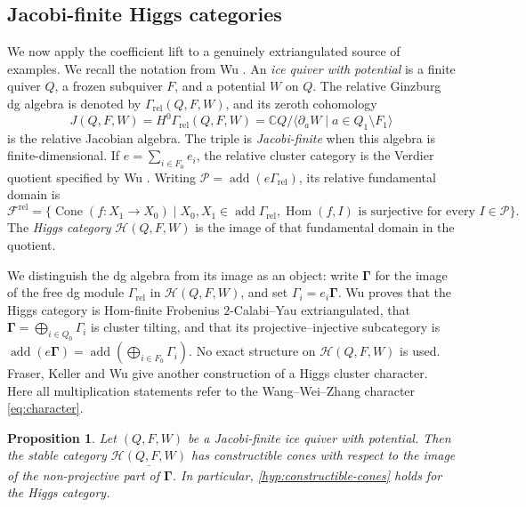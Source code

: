\documentclass[11pt,reqno]{article}
\numberwithin{equation}{section}
\newtheorem{proposition}[proposition]{Proposition}
\theoremstyle{definition}
\DeclareMathOperator{\add}{add}
\DeclareMathOperator{\Hom}{Hom}
\newcommand{\kk}{\mathbb C}
\begin{document}
\subsection{Jacobi-finite Higgs categories}\label{subsec:general-higgs}
We now apply the coefficient lift to a genuinely extriangulated source of
examples.  We recall the notation from Wu \cite{WuRelative}.  An
\emph{ice quiver with potential} is a finite quiver $Q$, a frozen subquiver
$F$, and a potential $W$ on $Q$.  The relative Ginzburg dg algebra is denoted
by $\Gamma_{\mathrm{rel}}(Q,F,W)$, and its zeroth cohomology
\[
 J(Q,F,W)=H^0\Gamma_{\mathrm{rel}}(Q,F,W)
 =\kk Q/\langle\partial_aW\mid a\in Q_1\setminus F_1\rangle
\]
is the relative Jacobian algebra.  The triple is \emph{Jacobi-finite} when this
algebra is finite-dimensional.  If $e=\sum_{i\in F_0}e_i$, the relative
cluster category is the Verdier quotient specified by Wu
\cite[Definition~7.9]{WuRelative}.  Writing $\mathcal P=\add(e\Gamma_{\mathrm{rel}})$, its relative fundamental domain is
\[
 \mathcal F^{\mathrm{rel}}=
 \{\operatorname{Cone}(f:X_1\to X_0)\mid
 X_0,X_1\in\add\Gamma_{\mathrm{rel}},
 \Hom(f,I)\text{ is surjective for every }I\in\mathcal P\}.
\]  The \emph{Higgs category}
$\mathcal H(Q,F,W)$ is the image of that fundamental domain in the quotient.

We distinguish the dg algebra from its image as an object: write
$\boldsymbol\Gamma$ for the image of the free dg module
$\Gamma_{\mathrm{rel}}$ in $\mathcal H(Q,F,W)$, and set
$\Gamma_i=e_i\boldsymbol\Gamma$.  Wu \cite[Theorem~7.10]{WuRelative} proves that the Higgs category is
Hom-finite Frobenius $2$-Calabi--Yau extriangulated, that
$\boldsymbol\Gamma=\bigoplus_{i\in Q_0}\Gamma_i$ is cluster tilting, and that
its projective--injective subcategory is
$\add(e\boldsymbol\Gamma)=\add(\bigoplus_{i\in F_0}\Gamma_i)$.  No exact structure on $\mathcal H(Q,F,W)$ is used. Fraser, Keller and Wu \cite[Theorem~5.4]{FraserKellerWu} give another construction of a Higgs cluster character. Here all multiplication statements refer to the Wang--Wei--Zhang character \eqref{eq:character}.

\begin{proposition}\label{prop:Higgs-constructible}
Let $(Q,F,W)$ be a Jacobi-finite ice quiver with potential.  Then the stable category $\underline{\mathcal H(Q,F,W)}$ has constructible cones with respect to the image of the non-projective part of $\boldsymbol\Gamma$.  In particular, \cref{hyp:constructible-cones} holds for the Higgs category.
\end{proposition}
\end{document}
